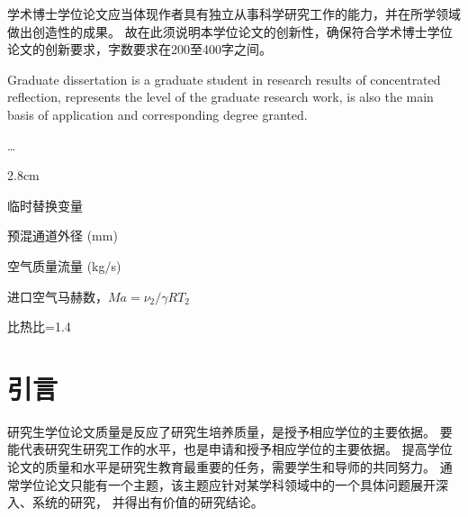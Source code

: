 \frontmatter
\begin{innovations}
  学术博士学位论文应当体现作者具有独立从事科学研究工作的能力，并在所学领域做出创造性的成果。
  故在此须说明本学位论文的创新性，确保符合学术博士学位论文的创新要求，字数要求在200至400字之间。
\end{innovations}


\begin{abstract}
  研究生学位论文是研究生在研究工作中所取得成果的集中反映，代表着研究生研究工作的水平，也是申请和授予相应学位的主要依据。\par
  ……
\end{abstract}

\begin{abstract*}
  Graduate dissertation is a graduate student in research results of concentrated reflection, represents the level of the graduate research work, is also the main basis of application and corresponding degree granted.\par
  \dots
\end{abstract*}

\tableofcontents

\listoffiguresandtables

\begin{notation}
  \begin{notationlist}{2.8cm}
    \item[$a$, $c_1$, $c_2$] 临时替换变量
    \item[$D_{\text{m}}$] 预混通道外径 (mm)
    \item[$G_{\text{a}}$] 空气质量流量 (kg/s)
    \item[$\mathit{Ma}$] 进口空气马赫数，$\mathit{Ma} = \nu_2 / \gamma R T_2$
    \item[$\gamma$] 比热比=1.4
  \end{notationlist}
\end{notation}

\mainmatter

\chapter{引言}

研究生学位论文质量是反应了研究生培养质量，是授予相应学位的主要依据。
要能代表研究生研究工作的水平，也是申请和授予相应学位的主要依据。
提高学位论文的质量和水平是研究生教育最重要的任务，需要学生和导师的共同努力。
通常学位论文只能有一个主题，该主题应针对某学科领域中的一个具体问题展开深入、系统的研究，
并得出有价值的研究结论。

